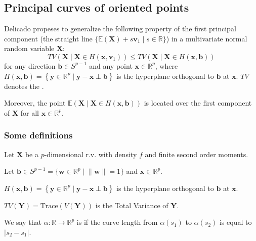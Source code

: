 \subsection{Principal curves of oriented points}

Delicado \cite{delicado_another_2001} propeses to generalize the following property of the
first principal component (the straight line
$\{\mathds{E}(\boldsymbol X) + s \boldsymbol v_1 \mid s \in \mathds{R}\}$)
in a multivariate normal random variable $\boldsymbol X$:
\begin{equation*}
	TV(\boldsymbol X \mid \boldsymbol X \in H(\boldsymbol x, \boldsymbol v_1))
	\leq
	TV(\boldsymbol X \mid \boldsymbol X \in H(\boldsymbol x, \boldsymbol b))
\end{equation*}
for any direction $\boldsymbol b \in S^{p-1}$ and any point $\boldsymbol x \in \mathds{R}^p$,
where $H(\boldsymbol x, \boldsymbol b) = \left\{
	\boldsymbol y \in \mathds{R}^p \mid \boldsymbol y - \boldsymbol x \perp \boldsymbol b
	\right\}$
is the hyperplane orthogonal to $\boldsymbol b$ at $\boldsymbol x$.
$TV$ denotes the .

Moreover, the point $\mathds{E}(\boldsymbol X \mid \boldsymbol X \in H(\boldsymbol x, \boldsymbol b))$
is located over the first component of $\boldsymbol X$ for all $\boldsymbol x \in \mathds{R}^p$.

\subsubsection{Some definitions}

Let $\boldsymbol X$ be a $p$-dimensional r.v. with density $f$ and finite
second order moments.

Let $\boldsymbol b \in S^{p-1} = \{\boldsymbol w \in \mathds{R}^p \mid
	\lVert \boldsymbol w \rVert = 1\}$ and $\boldsymbol x \in \mathds{R}^p$.

$H(\boldsymbol x, \boldsymbol b) = \left\{
	\boldsymbol y \in \mathds{R}^p \mid \boldsymbol y - \boldsymbol x \perp \boldsymbol b
	\right\}$ is the hyperplane orthogonal to $\boldsymbol b$ at $\boldsymbol x$.

$TV(\boldsymbol Y) = \text{Trace}(V(\boldsymbol Y))$ is the Total Variance of $\boldsymbol Y$.

We say that $\alpha : \mathds{R} \to \mathds{R}^p$ is 
if the curve length from $\alpha(s_1)$ to $\alpha(s_2)$ is equal to $|s_2 - s_1|$.


